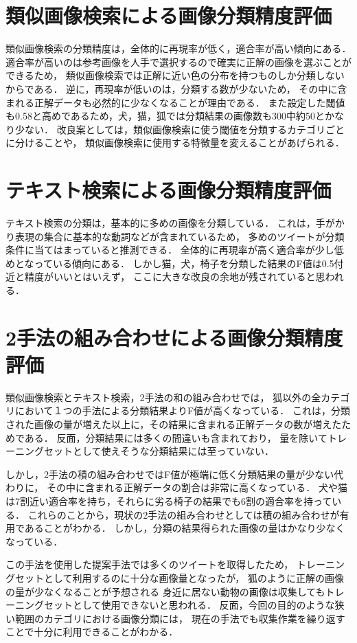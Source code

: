 \section{類似画像検索による画像分類精度評価}
類似画像検索の分類精度は，全体的に再現率が低く，適合率が高い傾向にある．
適合率が高いのは参考画像を人手で選択するので確実に正解の画像を選ぶことができるため，
類似画像検索では正解に近い色の分布を持つものしか分類しないからである．
逆に，再現率が低いのは，分類する数が少ないため，
その中に含まれる正解データも必然的に少なくなることが理由である．
また設定した閾値も0.58と高めであるため，犬，猫，狐では分類結果の画像数も300中約50とかなり少ない．
改良案としては，類似画像検索に使う閾値を分類するカテゴリごとに分けることや，
類似画像検索に使用する特徴量を変えることがあげられる．

\section{テキスト検索による画像分類精度評価}
テキスト検索の分類は，基本的に多めの画像を分類している．
これは，手がかり表現の集合に基本的な動詞などが含まれているため，
多めのツイートが分類条件に当てはまっていると推測できる．
全体的に再現率が高く適合率が少し低めとなっている傾向にある．
しかし猫，犬，椅子を分類した結果のF値は0.5付近と精度がいいとはいえず，
ここに大きな改良の余地が残されていると思われる．

\section{2手法の組み合わせによる画像分類精度評価}
類似画像検索とテキスト検索，2手法の和の組み合わせでは，
狐以外の全カテゴリにおいて１つの手法による分類結果よりF値が高くなっている．
これは，分類された画像の量が増えた以上に，その結果に含まれる正解データの数が増えたためである．
反面，分類結果には多くの間違いも含まれており，
量を除いてトレーニングセットとして使えそうな分類結果には至っていない．

しかし，2手法の積の組み合わせではF値が極端に低く分類結果の量が少ない代わりに，
その中に含まれる正解データの割合は非常に高くなっている．
犬や猫は7割近い適合率を持ち，それらに劣る椅子の結果でも6割の適合率を持っている．
これらのことから，現状の2手法の組み合わせとしては積の組み合わせが有用であることがわかる．
しかし，分類の結果得られた画像の量はかなり少なくなっている．

この手法を使用した提案手法では多くのツイートを取得したため，
トレーニングセットとして利用するのに十分な画像量となったが，
狐のように正解の画像の量が少なくなることが予想される
身近に居ない動物の画像は収集してもトレーニングセットとして使用できないと思われる．
反面，今回の目的のような狭い範囲のカテゴリにおける画像分類には，
現在の手法でも収集作業を繰り返すことで十分に利用できることがわかる．
